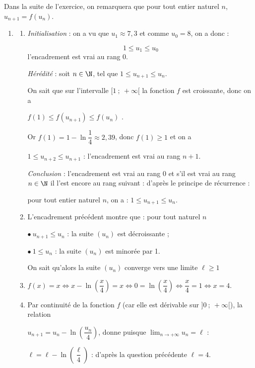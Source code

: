 Dans la suite de l'exercice, on remarquera que pour tout entier naturel $n$,\: $u_{n+1} = f\left(u_n\right)$.

\begin{enumerate}[resume]
\item 
	\begin{enumerate}
		\item 


\emph{Initialisation} : on a vu que $u_1 \approx 7,3$ et comme $u_0 = 8$, on a donc :

\[1 \leqslant u_{1} \leqslant u_0\]
l'encadrement est vrai au rang 0.

\emph{Hérédité} : soit $n \in \N$, tel que  $1 \leqslant u_{n+1} \leqslant u_n$.

On sait que sur l'intervalle $[1~;~+ \infty[$ la fonction $f$ est croissante, donc on a 

$f(1) \leqslant f\left(u_{n+1}\right) \leqslant f\left(u_{n}\right)$ .

Or $f(1) = 1 - \ln \dfrac14 \approx 2,39$, donc $f(1) \geqslant 1$ et on a 

$1 \leqslant u_{n+2} \leqslant u_{n+1}$ : l'encadrement est vrai au rang $n + 1$.

\emph{Conclusion} : l'encadrement est vrai au rang 0 et s'il est vrai au rang $n \in \N$ il l'est encore au rang suivant : d'après le principe de récurrence :

pour tout entier naturel $n$, on a : $1 \leqslant u_{n+1} \leqslant u_n.$

	\item L'encadrement précédent montre que : pour tout naturel $n$

$\bullet~ u_{n+1} \leqslant u_n$ : la suite $\left(u_n\right)$ est décroissante ;

$\bullet~ 1 \leqslant u_n$ :  la suite $\left(u_n\right)$ est minorée par 1.

On sait qu'alors la suite $\left(u_n\right)$ converge vers une limite $\ell \geqslant 1$




		\item 
$f(x) = x \iff x - \ln \left(\dfrac x4 \right) = x \iff 0 = \ln \left(\dfrac x4 \right) \iff \dfrac x4  = 1 \iff x = 4$.
		\item 
Par continuité de la fonction $f$ (car elle est dérivable sur $]0~;~+ \infty[$), la relation 

$u_{n+1} = u_n - \ln \left(\dfrac{u_n}{4}\right)$, donne puisque $\displaystyle\lim_{ n \to + \infty} u_n = \ell$ :

$\ell = \ell - \ln \left(\dfrac{\ell}{4}\right)$ : d'après la question précédente $\ell = 4$.

	\end{enumerate}
\end{enumerate}

\bigskip
